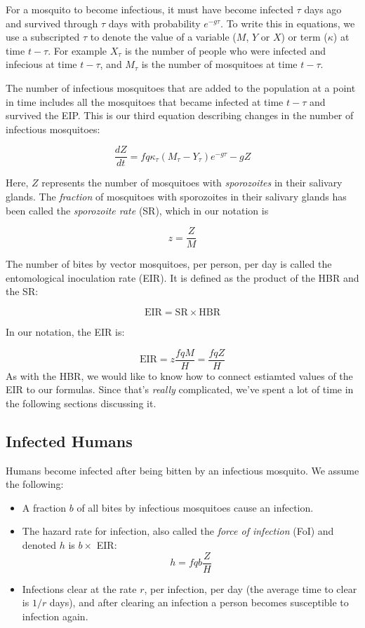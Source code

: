 \documentclass[
]{book}
\begin{document}
For a mosquito to become infectious, it must have become infected \(\tau\) days ago and survived through \(\tau\) days with probability \(e^{-g\tau}\). To write this in equations, we use a subscripted \(\tau\) to denote the value of a variable (\(M\), \(Y\) or \(X\)) or term (\(\kappa\)) at time \(t-\tau\). For example \(X_\tau\) is the number of people who were infected and infecious at time \(t-\tau\), and \(M_\tau\) is the number of mosquitoes at time \(t-\tau\).

The number of infectious mosquitoes that are added to the population at a point in time includes all the mosquitoes that became infected at time \(t-\tau\) and survived the EIP. This is our third equation describing changes in the number of infectious mosquitoes:

\begin{equation}
\frac{dZ}{dt} = f q  \kappa_\tau (M_\tau-Y_\tau) e^{-g\tau} -g Z
\end{equation}

Here, \(Z\) represents the number of mosquitoes with \emph{sporozoites} in their salivary glands. The \emph{fraction} of mosquitoes with sporozoites in their salivary glands has been called the \emph{sporozoite rate} (SR), which in our notation is

\[ z = \frac{Z}{M}\]

The number of bites by vector mosquitoes, per person, per day is called the entomological inoculation rate (EIR). It is defined as the product of the HBR and the SR:

\[\mbox{EIR} = \mbox{SR} \times \mbox{HBR}\]

In our notation, the EIR is:

\[\mbox{EIR} = z \frac{fqM}{H} = \frac{fqZ}{H}\]
As with the HBR, we would like to know how to connect estiamted values of the EIR to our formulas. Since that's \emph{really} complicated, we've spent a lot of time in the following sections discussing it.

\hypertarget{RossEqn}{%
\subsection{Infected Humans}\label{RossEqn}}

Humans become infected after being bitten by an infectious mosquito. We assume the following:

\begin{itemize}
\item
  A fraction \(b\) of all bites by infectious mosquitoes cause an infection.
\item
  The hazard rate for infection, also called the \emph{force of infection} (FoI) and denoted \(h\) is \(b \times\) EIR: \[h = fqb \frac{Z}{H}\]
\item
  Infections clear at the rate \(r\), per infection, per day (the average time to clear is \(1/r\) days), and after clearing an infection a person becomes susceptible to infection again.
\end{itemize}
\end{document}
